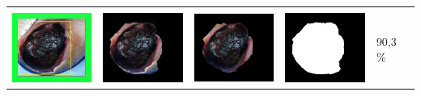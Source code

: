 \begin{table}[H]
\begin{tabular}{|m{1.1in}|m{1.1in}|m{1.1in}|m{1.1in}|m{0.7in}|}
		&  &  & \\
		\includegraphics[width=1.1in]{gambar/hasil_segmentasi/luka_hitam/image_17_rect.jpg} \fontsize{8}{12}{(28, 34, 208, 213)}&
		\includegraphics[width=1.1in]{gambar/hasil_segmentasi/luka_hitam/result_17.jpg}&
		\includegraphics[width=1.1in]{gambar/hasil_segmentasi/luka_hitam/result_17_cv.jpg}&
		\includegraphics[width=1.1in]{gambar/hasil_segmentasi/luka_hitam/mask_17.jpg}&
		90,3 \% \\
		\hline
		

\end{tabular}
\end{table}
